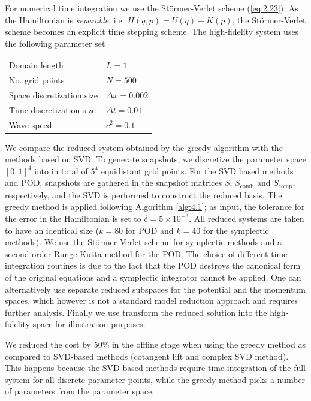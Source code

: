 For numerical time integration we use the St\"ormer-Verlet scheme (\ref{eq:2.23}). As the Hamiltonian is \emph{separable}, i.e. $H(q,p) = U(q) + K(p)$, the St\"ormer-Verlet scheme becomes an explicit time stepping scheme. The high-fidelity system uses the following parameter set \vspace{0.5cm}
\begin{center}
\begin{tabular}{|l|l|}
\hline
Domain length & $L = 1$ \\
No. grid points & $N = 500$ \\
Space discretization size & $\Delta x = 0.002$ \\
Time discretization size & $\Delta t = 0.01$ \\
Wave speed & $c^2 = 0.1$ \\
\hline
\end{tabular}
\end{center}
\vspace{0.5cm}
We compare the reduced system obtained by the greedy algorithm with the methods based on SVD. To generate snapshots, we discretize the parameter space $[0,1]^4$ into in total of $5^4$ equidistant grid points. For the SVD based methods and POD, snapshots are gathered in the snapshot matrices $S$, $S_{\text{comb}}$ and $S_{\text{comp}}$, respectively, and the SVD is performed to construct the reduced basis. The greedy method is applied following Algorithm \ref{alg:4.1}; as input, the tolerance for the error in the Hamiltonian is set to $\delta = 5 \times 10^{-3}$. All reduced systems are taken to have an identical size ($k=80$ for POD and $k=40$ for the symplectic methods). We use the St\"ormer-Verlet scheme for symplectic methods and a second order Runge-Kutta method for the POD. The choice of different time integration routines is due to the fact that the POD destroys the canonical form of the original equations and a symplectic integrator cannot be applied. One can alternatively use separate reduced subspaces for the potential and the momentum spaces, which however is not a standard model reduction approach and requires further analysis. Finally we use transform the reduced solution into the high-fidelity space for illustration purposes.



We reduced the cost by 50\% in the offline stage when using the greedy method as compared to SVD-based methods (cotangent lift and complex SVD method). This happens because the SVD-based methods require time integration of the full system for all discrete parameter points, while the greedy method picks a number of parameters from the parameter space. 

